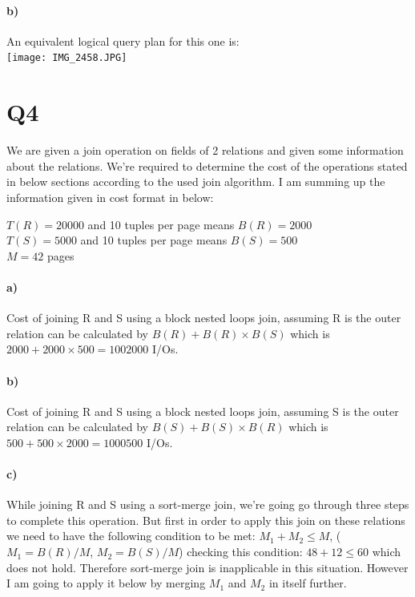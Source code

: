\documentclass[a4paper,12pt]{article}
\begin{document}
\paragraph{b)} An equivalent logical query plan for this one is: \\
\texttt{[image: IMG\_2458.JPG]}
    
\section{Q4}

We are given a join operation on fields of 2 relations and given some information about the relations. We're required to determine the cost of the operations stated in below sections according to the used join algorithm. I am summing up the information given in cost format in below:

\begin{center}
    $T(R) = 20000$ and 10 tuples per page means $B(R) = 2000$ \\
    $T(S) = 5000$ and 10 tuples per page means $B(S) = 500$ \\
    $M = 42$ pages
\end{center}

\paragraph{a)} Cost of joining R and S using a block nested loops join, assuming R is the outer relation can be calculated by $B(R) + B(R)\times B(S)$ which is $2000 + 2000\times 500 = 1002000$ I/Os.

\paragraph{b)} Cost of joining R and S using a block nested loops join, assuming S is the outer relation can be calculated by $B(S) + B(S)\times B(R)$ which is $500 + 500\times 2000 = 1000500$ I/Os.

\paragraph{c)} While joining R and S using a sort-merge join, we're going go through three steps to complete this operation. But first in order to apply this join on these relations we need to have the following condition to be met: $M_1+M_2 \leq M$, ($M_1=B(R)/M$, $M_2=B(S)/M$) checking this condition: $48+12 \leq 60$ which does not hold. Therefore sort-merge join is inapplicable in this situation. However I am going to apply it below by merging $M_1$ and $M_2$ in itself further.
\end{document}

